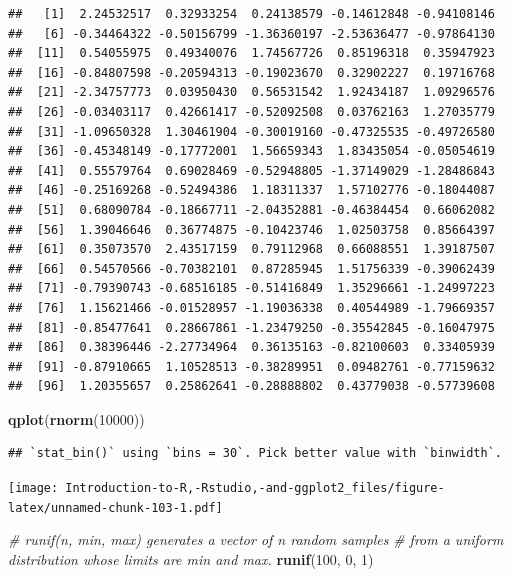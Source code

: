 \documentclass[]{book}
\newenvironment{Shaded}{\begin{snugshade}}{\end{snugshade}}
\newcommand{\CommentTok}[1]{\textcolor[rgb]{0.56,0.35,0.01}{\textit{#1}}}
\newcommand{\DecValTok}[1]{\textcolor[rgb]{0.00,0.00,0.81}{#1}}
\newcommand{\KeywordTok}[1]{\textcolor[rgb]{0.13,0.29,0.53}{\textbf{#1}}}
\newcommand{\NormalTok}[1]{#1}
\begin{document}
\begin{verbatim}
##   [1]  2.24532517  0.32933254  0.24138579 -0.14612848 -0.94108146
##   [6] -0.34464322 -0.50156799 -1.36360197 -2.53636477 -0.97864130
##  [11]  0.54055975  0.49340076  1.74567726  0.85196318  0.35947923
##  [16] -0.84807598 -0.20594313 -0.19023670  0.32902227  0.19716768
##  [21] -2.34757773  0.03950430  0.56531542  1.92434187  1.09296576
##  [26] -0.03403117  0.42661417 -0.52092508  0.03762163  1.27035779
##  [31] -1.09650328  1.30461904 -0.30019160 -0.47325535 -0.49726580
##  [36] -0.45348149 -0.17772001  1.56659343  1.83435054 -0.05054619
##  [41]  0.55579764  0.69028469 -0.52948805 -1.37149029 -1.28486843
##  [46] -0.25169268 -0.52494386  1.18311337  1.57102776 -0.18044087
##  [51]  0.68090784 -0.18667711 -2.04352881 -0.46384454  0.66062082
##  [56]  1.39046646  0.36774875 -0.10423746  1.02503758  0.85664397
##  [61]  0.35073570  2.43517159  0.79112968  0.66088551  1.39187507
##  [66]  0.54570566 -0.70382101  0.87285945  1.51756339 -0.39062439
##  [71] -0.79390743 -0.68516185 -0.51416849  1.35296661 -1.24997223
##  [76]  1.15621466 -0.01528957 -1.19036338  0.40544989 -1.79669357
##  [81] -0.85477641  0.28667861 -1.23479250 -0.35542845 -0.16047975
##  [86]  0.38396446 -2.27734964  0.36135163 -0.82100603  0.33405939
##  [91] -0.87910665  1.10528513 -0.38289951  0.09482761 -0.77159632
##  [96]  1.20355657  0.25862641 -0.28888802  0.43779038 -0.57739608
\end{verbatim}

\begin{Shaded}
\begin{Highlighting}[]
\KeywordTok{qplot}\NormalTok{(}\KeywordTok{rnorm}\NormalTok{(}\DecValTok{10000}\NormalTok{))}
\end{Highlighting}
\end{Shaded}

\begin{verbatim}
## `stat_bin()` using `bins = 30`. Pick better value with `binwidth`.
\end{verbatim}

\texttt{[image: Introduction-to-R,-Rstudio,-and-ggplot2\_files/figure-latex/unnamed-chunk-103-1.pdf]}

\begin{Shaded}
\begin{Highlighting}[]
\CommentTok{# runif(n, min, max) generates a vector of n random samples }
\CommentTok{# from a uniform distribution whose limits are min and max. }
\KeywordTok{runif}\NormalTok{(}\DecValTok{100}\NormalTok{, }\DecValTok{0}\NormalTok{, }\DecValTok{1}\NormalTok{)}
\end{Highlighting}
\end{Shaded}
\end{document}
